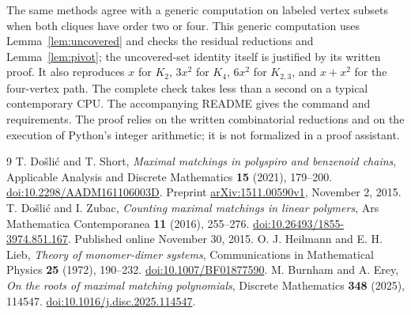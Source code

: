 \documentclass[11pt]{article}
\begin{document}
The same methods agree with a generic computation on labeled vertex
subsets when both cliques have order two or four. This generic
computation uses Lemma~\ref{lem:uncovered} and checks the residual
reductions and Lemma~\ref{lem:pivot}; the uncovered-set identity itself
is justified by its written proof. It also reproduces $x$ for $K_2$, $3x^2$ for $K_4$,
$6x^2$ for $K_{2,3}$, and $x+x^2$ for the four-vertex path.
The complete check takes less than a second on a typical contemporary
CPU. The accompanying README gives the command and requirements.
The proof relies on the written combinatorial reductions and on the
execution of Python's integer arithmetic; it is not formalized in a
proof assistant.

\begin{thebibliography}{9}
T. Do\v{s}li\'c and T. Short,
\emph{Maximal matchings in polyspiro and benzenoid chains},
Applicable Analysis and Discrete Mathematics \textbf{15} (2021), 179--200.
\href{https://doi.org/10.2298/AADM161106003D}{doi:10.2298/AADM161106003D}.
Preprint \href{https://arxiv.org/abs/1511.00590v1}{arXiv:1511.00590v1},
November 2, 2015.
T. Do\v{s}li\'c and I. Zubac,
\emph{Counting maximal matchings in linear polymers},
Ars Mathematica Contemporanea \textbf{11} (2016), 255--276.
\href{https://doi.org/10.26493/1855-3974.851.167}{doi:10.26493/1855-3974.851.167}.
Published online November 30, 2015.
O. J. Heilmann and E. H. Lieb,
\emph{Theory of monomer-dimer systems},
Communications in Mathematical Physics \textbf{25} (1972), 190--232.
\href{https://doi.org/10.1007/BF01877590}{doi:10.1007/BF01877590}.
M. Burnham and A. Erey,
\emph{On the roots of maximal matching polynomials},
Discrete Mathematics \textbf{348} (2025), 114547.
\href{https://doi.org/10.1016/j.disc.2025.114547}{doi:10.1016/j.disc.2025.114547}.
\end{thebibliography}
\end{document}
